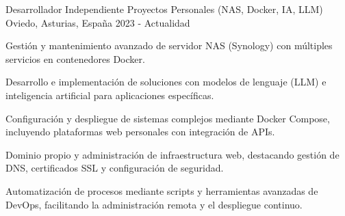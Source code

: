 
\begin{cventries}

  \cventry
    {Desarrollador Independiente} %
    {Proyectos Personales (NAS, Docker, IA, LLM)} %
    {Oviedo, Asturias, España} %
    {2023 - Actualidad} %
    {
      \begin{cvitems} %
        \item {Gestión y mantenimiento avanzado de servidor NAS (Synology) con múltiples servicios en contenedores Docker.}
        \item {Desarrollo e implementación de soluciones con modelos de lenguaje (LLM) e inteligencia artificial para aplicaciones específicas.}
        \item {Configuración y despliegue de sistemas complejos mediante Docker Compose, incluyendo plataformas web personales con integración de APIs.}
        \item {Dominio propio y administración de infraestructura web, destacando gestión de DNS, certificados SSL y configuración de seguridad.}
        \item {Automatización de procesos mediante scripts y herramientas avanzadas de DevOps, facilitando la administración remota y el despliegue continuo.}
      \end{cvitems}
    }

\end{cventries}
